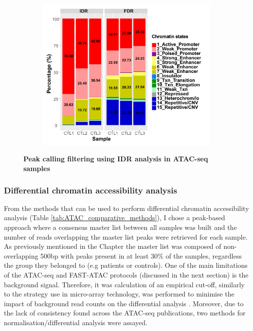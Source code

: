 \begin{figure}[htbp]
\begin{subfigure}{0.65\textwidth}
\includegraphics[width=\textwidth]{./Results1/pdfs/stacked_barplot_chromatin_states_percent_CD4_qval_vs_PVAL_IDR_filtered}
\caption{\textbf{}} %
\end{subfigure}%
\caption[Peak calling filtering using IDR analysis in ATAC-seq samples]{\textbf{Peak calling filtering using IDR analysis in ATAC-seq samples}}
\label{fig:Peak_calling_IDR_filtering_and_chrom_stated_ATAC}
\end{figure} 




\subsubsection{Differential chromatin accessibility analysis}

From the methods that can be used to perform differential chromatin accessibility analysis (Table \ref{tab:ATAC_comparative_methods}), I chose a peak-based approach where a consensus master list between all samples was built and the number of reads overlapping the master list peaks were retrieved for each sample. As previously mentioned in the Chapter \label{ch:Mat} the master list was composed of non-overlapping 500bp with peaks present in at least 30\% of the samples, regardless the group they belonged to (e.g patients or controls). One of the main limitations of the ATAC-seq and FAST-ATAC protocols (discussed in the next section) is the background signal. Therefore, it was calculation of an empirical cut-off, similarly to the strategy use in micro-array technology, was performed to minimise the impact of background read counts on the differential analysis \parencite{Xinmin2005,Jonker2014}. Moreover, due to the lack of consistency found across the ATAC-seq publications, two methods for normalisation/differential analysis were assayed.

